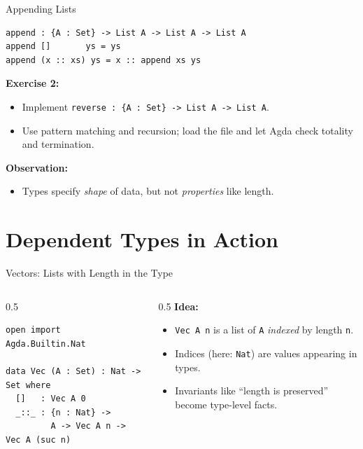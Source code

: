 \documentclass[aspectratio=169]{beamer}
\begin{document}
\begin{frame}[fragile]{Appending Lists}
\begin{lstlisting}
append : {A : Set} -> List A -> List A -> List A
append []       ys = ys
append (x :: xs) ys = x :: append xs ys
\end{lstlisting}

  \textbf{Exercise 2:}
  \begin{itemize}
    \item Implement \texttt{reverse : \{A : Set\} -> List A -> List A}.
    \item Use pattern matching and recursion; load the file and
          let Agda check totality and termination.
  \end{itemize}

  \vfill
  \textbf{Observation:}
  \begin{itemize}
    \item Types specify \emph{shape} of data, but not \emph{properties} like length.
  \end{itemize}
\end{frame}

\section{Dependent Types in Action}

\begin{frame}[fragile]{Vectors: Lists with Length in the Type}
  \begin{columns}
    \begin{column}{0.5\textwidth}
\begin{lstlisting}
open import Agda.Builtin.Nat

data Vec (A : Set) : Nat -> Set where
  []   : Vec A 0
  _::_ : {n : Nat} ->
         A -> Vec A n -> Vec A (suc n)
\end{lstlisting}
    \end{column}
    \begin{column}{0.5\textwidth}
      \textbf{Idea:}
      \begin{itemize}
        \item \texttt{Vec A n} is a list of \texttt{A} \emph{indexed} by length \texttt{n}.
        \item Indices (here: \texttt{Nat}) are values appearing in types.
        \item Invariants like “length is preserved” become type-level facts.
      \end{itemize}
    \end{column}
  \end{columns}
\end{frame}
\end{document}
